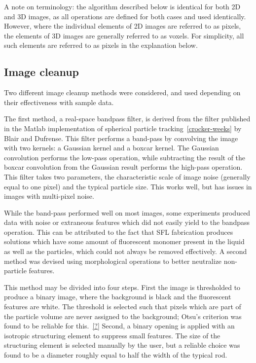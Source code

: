 A note on terminology: the algorithm described below is identical for both 2D and 3D images, as all
operations are defined for both cases and used identically. However, where the individual elements of
2D images are referred to as pixels, the elements of 3D images are generally referred to as voxels.
For simplicity, all such elements are referred to as pixels in the explanation below.

\subsection{Image cleanup}

Two different image cleanup methods were considered, and used depending on their effectiveness with
sample data.

The first method, a real-space bandpass filter, is derived from the filter published in the 
Matlab implementation of spherical particle tracking~\ref{crocker-weeks} by Blair and
Dufrense. This filter performs a band-pass by convolving the image with two kernels: 
a Gaussian kernel and a boxcar kernel.  The Gaussian convolution performs the low-pass
operation, while subtracting the result of the boxcar convolution from the Gaussian result
performs the high-pass operation. This filter takes two parameters, the characteristic scale
of image noise (generally equal to one pixel) and the typical particle size.  This works well,
but has issues in images with multi-pixel noise.

While the band-pass performed well on most images, some experiments produced data with noise or
extraneous features which did
not easily yield to the bandpass operation. This can be attributed to the fact that SFL fabrication produces
solutions which have some amount of fluorescent monomer present in the liquid as well as the particles, which
could not always be removed effectively.  A second method was devised using morphological
operations to better neutralize non-particle features.

This method may be divided into four steps. First the image is thresholded to produce a binary image, where the 
background is black and the fluorescent features are white. The threshold is selected such that pixels which 
are part of the particle volume are never assigned to the background; Otsu's criterion was found to be reliable
for this.~\ref{?}  Second, a binary opening is applied with an isotropic structuring element to
suppress small features. The size of the structuring element is selected manually by the user, but a 
reliable choice was found to be a diameter roughly equal to half the width of the typical rod. 

